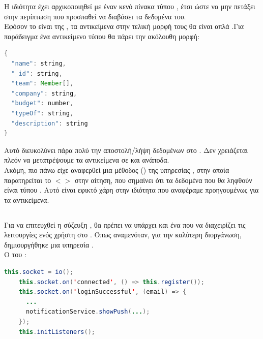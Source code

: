 \pSpace Η ιδιότητα  έχει αρχικοποιηθεί με έναν κενό πίνακα τύπου , έτσι ώστε να μην πετάξει  στην περίπτωση που προσπαθεί να διαβάσει τα δεδομένα του.\\
\pSpace Εφόσον το  είναι  της , τα αντικείμενα στην τελική μορφή τους θα είναι απλά .Για παράδειγμα ένα αντικείμενο τύπου  θα πάρει την ακόλουθη μορφή:\\
	\begin{lstlisting}[language=Java]
{ 
  "name": string,
  "_id": string,
  "team": Member[],
  "company": string,
  "budget": number,
  "typeOf": string,
  "description": string
}
	\end{lstlisting}
\pSpace Αυτό διευκολύνει πάρα πολύ την αποστολή/λήψη δεδομένων στο . Δεν χρειάζεται πλεόν να μετατρέψουμε τα αντικείμενα σε  και ανάποδα.\\
\pSpace Ακόμη, πιο πάνω είχε αναφερθεί μια μέθοδος () της υπηρεσίας , στην οποία παρατηρείται το $<$$>$ στην αίτηση, που σημαίνει ότι τα δεδομένα που θα ληφθούν είναι τύπου . Αυτό είναι εφικτό χάρη στην ιδιότητα που αναφέραμε προηγουμένως για τα αντικείμενα. 

\subsection*{}

\pSpace Για να επιτευχθεί η σύζευξη , θα πρέπει να υπάρχει και ένα  που να διαχειρίζει τις λειτουργίες ενός χρήστη στο . Όπως αναμενόταν, για την καλύτερη διοργάνωση, δημιουργήθηκε μια υπηρεσία .\\
\pSpace Ο  του :\\

	\begin{lstlisting}[language=Java]
this.socket = io();
    this.socket.on('connected', () => this.register());
    this.socket.on('loginSuccessful', (email) => {
      ...
      notificationService.showPush(...);
    });
    this.initListeners();
	\end{lstlisting}

